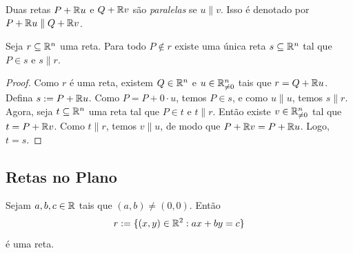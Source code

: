 \begin{definition}
    Duas retas $P + \mathbb{R} u$ e $Q + \mathbb{R} v$ são \emph{paralelas} se $u \parallel v$. Isso é denotado por $P + \mathbb{R} u \parallel Q + \mathbb{R} v$.
\end{definition}

\begin{corollary} 
    Seja $r \subseteq \mathbb{R}^n$ uma reta. Para todo $P \notin r$ existe uma única reta $s \subseteq \mathbb{R}^n$ tal que $P \in s$ e $s \parallel r$. 
\end{corollary}

\begin{proof}
    Como $r$ é uma reta, existem $Q \in \mathbb{R}^n$ e $u \in \mathbb{R}^n_{\neq 0}$ tais que $r = Q + \mathbb{R} u$. Defina $s := P + \mathbb{R} u$. Como $P = P + 0 \cdot u$, temos $P \in s$, e como $u \parallel u$, temos $s \parallel r$. Agora, seja $t \subseteq \mathbb{R}^n$ uma reta tal que $P \in t$ e $t \parallel r$. Então existe $v \in \mathbb{R}^n_{\neq 0}$ tal que $t = P + \mathbb{R} v$. Como $t \parallel r$, temos $v \parallel u$, de modo que $P + \mathbb{R} v = P + \mathbb{R} u$. Logo, $t = s$. \blackproof
\end{proof}

\subsection{Retas no Plano}

\begin{theorem}
    Sejam $a,b,c \in \mathbb{R}$ tais que $(a,b) \neq (0,0)$. Então
        \[
            r := \{(x,y) \in \mathbb{R}^2 : ax+by=c \}
        \]
    é uma reta.
\end{theorem}

